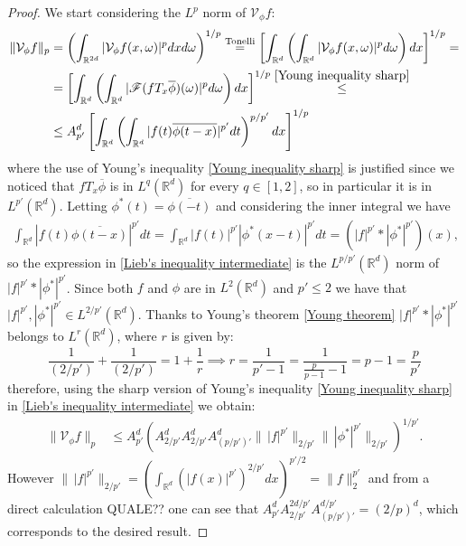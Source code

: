 \documentclass[corpo=11pt, stile=classica, tipotesi=custom,
greek, evenboxes, english]{toptesi}
\numberwithin{equation}{chapter}
\theoremstyle{remark}
\newcommand{\R}{\mathbb{R}} %
\newcommand{\V}{\mathcal{V}} %
\newcommand{\F}{\mathscr{F}} %
\begin{document}
\begin{proof}
	We start considering the $L^p$ norm of $\V_{\phi} f$:
	\begin{align}
		\|\V_{\phi} f\|_p &= \left(\int_{\R^{2d}} |\V_{\phi}f(x,\omega)|^p dxd\omega\right)^{1/p} \overset{\mathrm{Tonelli}}{=} \left[\int_{\R^d} \left(\int_{\R^d} |\V_{\phi} f (x,\omega)|^p d\omega\right)dx\right]^{1/p} =\nonumber \\
						  &= \left[\int_{\R^d} \left(\int_{\R^d} |\F(f T_x \overline{\phi})(\omega)|^p d\omega\right)dx\right]^{1/p} \overset{\eqref{Young inequality sharp}}{\leq} \nonumber\\
						  &\leq A_{p'}^d\left[\int_{\R^d} \left(\int_{\R^d} |f(t) \overline{\phi(t-x)}|^{p'}dt\right)^{p/p'}dx\right]^{1/p} \label{Lieb's inequality intermediate}
	\end{align}
	where the use of Young's inequality \eqref{Young inequality sharp} is justified since we noticed that $fT_x \overline{\phi}$ is in $L^q(\R^d)$ for every $q \in [1,2]$, so in particular it is in $L^{p'}(\R^d)$. Letting $\phi^*(t) = \overline{\phi(-t)}$ and considering the inner integral we have
	\begin{align*}
		\int_{\R^d} |f(t) \overline{\phi(t-x)}|^{p'}dt = \int_{\R^d} |f(t)|^{p'} |\phi^*(x-t)|^{p'}dt = \left(|f|^{p'} * |\phi^*|^{p'}\right)(x),
	\end{align*}
	so the expression in \eqref{Lieb's inequality intermediate} is the $L^{p/p'}(\R^d)$ norm of $|f|^{p'} * |\phi^*|^{p'}$. Since both $f$ and $\phi$ are in $L^2(\R^d)$ and $p' \leq 2$ we have that $|f|^{p'},|\phi^*|^{p'} \in L^{2/p'}(\R^d)$. Thanks to Young's theorem \ref{Young theorem} $|f|^{p'} * |\phi^*|^{p'}$ belongs to $L^r(\R^d)$, where $r$ is given by:
	\begin{equation*}
		\dfrac{1}{(2/p')} + \dfrac{1}{(2/p')} = 1 + \dfrac{1}{r} \implies r = \dfrac{1}{p'-1} = \dfrac{1}{\frac{p}{p-1}-1} = p-1 = \dfrac{p}{p'}
	\end{equation*}
	therefore, using the sharp version of Young's inequality \eqref{Young inequality sharp} in \eqref{Lieb's inequality intermediate} we obtain:
	\begin{align*}
		\|\V_{\phi} f\|_p &\leq A_{p'}^d \left(A_{2/p'}^d A_{2/p'}^d A_{(p/p')'}^d \| \,|f|^{p'} \|_{2/p'} \|\,|\phi^*|^{p'}\|_{2/p'} \right)^{1/p'}.
	\end{align*}
	However $\| \,|f|^{p'} \|_{2/p'} = (\int_{\R^d} (|f(x)|^{p'})^{2/p'}dx)^{p'/2} = \|f\|_2^{p'}$ and from a direct calculation {\color{blue} QUALE??} one can see that $A_{p'}^d A_{2/p'}^{2d/p'}A_{(p/p')'}^{d/p'}=(2/p)^d$, which corresponds to the desired result.
\end{proof}
\end{document}
